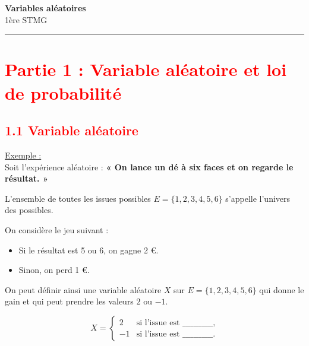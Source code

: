 \documentclass[12pt]{article}
\begin{document}

\begin{center}
    {\LARGE \textbf{Variables aléatoires}}\\[4mm]
    {\large 1ère STMG}
\end{center}

\hrule
\vspace{0.4cm}


\section*{\textcolor{red}{Partie 1 : Variable aléatoire et loi de probabilité}}

\subsection*{\textcolor{red}{1.1 Variable aléatoire}}

\vspace{5pt}

\underline{Exemple :}
\vspace{10pt}
\\Soit l'expérience aléatoire : \textbf{« On lance un dé à six faces et on regarde le résultat. »}

L'ensemble de toutes les issues possibles $E = \{1, 2, 3, 4, 5, 6\}$ s'appelle l'univers des possibles.  

On considère le jeu suivant :  
\begin{itemize}
    \item Si le résultat est 5 ou 6, on gagne 2 €.
    \item Sinon, on perd 1 €.
\end{itemize}

On peut définir ainsi une variable aléatoire $X$ sur $E = \{1, 2, 3, 4, 5, 6\}$ qui donne le gain et qui 
peut prendre les valeurs $2$ ou $-1$.  

\[
X = 
\begin{cases}
2 & \text{si l'issue est \_\_\_\_\_\_\_\_\_\_\_}, \\[4mm]
-1 & \text{si l'issue est \_\_\_\_\_\_\_\_\_\_\_}.
\end{cases}
\]

\vspace{10pt}
\end{document}
